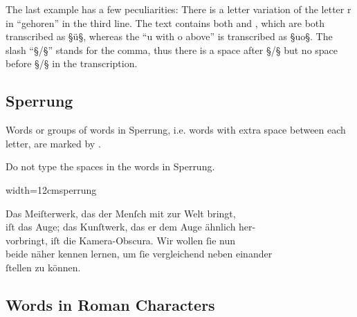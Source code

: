 \begin{note}
The last example has a few peculiarities: There is a letter variation of the letter r in “gehoren” in the third line. The text contains both  and , which are both transcribed as §ü§, whereas the “u with o above” is transcribed as §{uo}§. The slash “§/§” stands for the comma, thus there is a space after §/§ but no space before §/§ in the transcription.
\end{note}



\tocspace
\subsection{Sperrung}
\label{section sperrung}

\begin{mainrule}
Words or groups of words in Sperrung, i.e. words with extra space between each letter, are marked by .
\end{mainrule}

\begin{clarification}
Do not type the spaces in the words in Sperrung.
\end{clarification}

\vspace{3mm}
\begin{sampleImageSmall}{width=12cm}{sperrung}
\begin{typeLatin}
Das Meiſterwerk, das der Menſch mit zur Welt bringt,  \\
iſt das Auge; das Kunſtwerk, das er dem Auge ähnlich her-  \\
vorbringt, iſt die Kamera-Obscura. Wir wollen ſie nun  \\
beide näher kennen lernen, um ſie vergleichend neben einander  \\
ſtellen zu können.
\end{typeLatin}
\end{sampleImageSmall}

\tocspace
\subsection{Words in Roman Characters}
\label{section words in roman characters}

